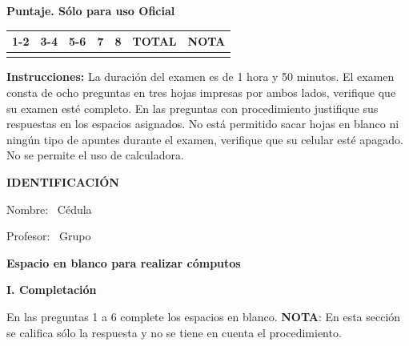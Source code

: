 \documentclass[11pt]{article}
\begin{document}
\examheader

\vspace{4pt}
\noindent
\begin{minipage}[t]{0.62\linewidth}
\textbf{Puntaje. Sólo para uso Oficial}\\[4pt]
\begin{tabular}{|c|c|c|c|c|c|c|}
\hline
1-2 & 3-4 & 5-6 & 7 & 8 & \textbf{TOTAL} & \textbf{NOTA} \\ \hline
 & & & & & & \\ \hline
\end{tabular}
\end{minipage}

\vspace{6pt}
\noindent\textbf{Instrucciones:} La duración del examen es de 1 hora y 50 minutos. El examen consta de ocho preguntas en tres hojas impresas por ambos lados, verifique que su examen esté completo. En las preguntas con procedimiento justifique sus respuestas en los espacios asignados. No está permitido sacar hojas en blanco ni ningún tipo de apuntes durante el examen, verifique que su celular esté apagado. No se permite el uso de calculadora.

\vspace{6pt}
\noindent\textbf{IDENTIFICACIÓN}

\vspace{8pt}
\noindent Nombre: \dotfill\ Cédula \dotfill

\vspace{4pt}
\noindent Profesor: \dotfill\ Grupo \dotfill

\vspace{6pt}
\begin{center}
\textbf{Espacio en blanco para realizar cómputos}
\end{center}

\newpage
\noindent\textbf{\large I. Completación}

\vspace{2pt}
\noindent En las preguntas 1 a 6 complete los espacios en blanco. \textbf{NOTA}: En esta sección se califica sólo la respuesta y no se tiene en cuenta el procedimiento.
\end{document}
